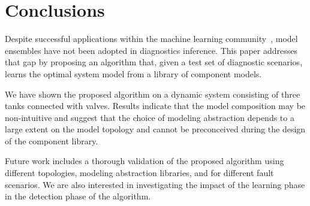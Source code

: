 \section{Conclusions}\label{sec:conclusions}
%
Despite successful applications within the machine learning community~\citep{brown2010ensemble,dietterich2000ensemble},
model ensembles have not been adopted in diagnostics inference. This paper addresses that gap by proposing
an algorithm that, given a test set of diagnostic scenarios, learns the optimal system model from a library of component
models.

We have shown the proposed algorithm on a dynamic system consisting of three tanks connected with valves. Results
indicate that the model composition may be non-intuitive and suggest that the choice of modeling abstraction depends
to a large extent on the model topology and cannot be preconceived during the design of the component library.

Future work includes a thorough validation of the proposed algorithm using different topologies, modeling abstraction
libraries, and for different fault scenarios. We are also interested in investigating the impact of the learning phase
in the detection phase of the algorithm.
